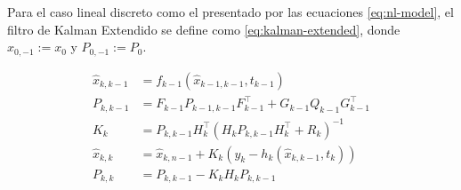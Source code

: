 


\begin{mdframed}[style=mystyle,frametitle=Filtro de Kalman Extendido (EKF)]

Para el caso lineal discreto como el presentado por las ecuaciones \ref{eq:nl-model}, el filtro de Kalman Extendido se define como \ref{eq:kalman-extended}, donde \(\hat{x}_{0,-1}:= x_0\) y \(P_{0,-1}:= P_0\). 

\begin{equation}\label{eq:kalman-extended}
\begin{aligned}
\hat{x}_{k,k-1} &= f_{k-1}( \hat{x}_{k-1,k-1}, t_{k-1}) \\
P_{k,k-1} &= F_{k-1} P_{k-1,k-1} F_{k-1}^{\top} + G_{k-1} Q_{k-1} G_{k-1}^{\top}\\
K_k &= P_{k,k-1} H^{\top}_{k}(H_{k}P_{k,k-1}H_{k}^{\top} + R_k)^{-1}\\
\hat{x}_{k,k} &= \hat{x}_{k, n-1} + K_k(y_k-h_k(\hat{x}_{k,k-1}, t_k)) \\
P_{k,k} &= P_{k,k-1}- K_k H_{k}P_{k,k-1} \\
\end{aligned}
\end{equation}
\end{mdframed}




